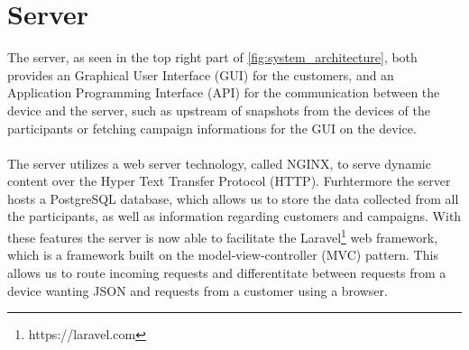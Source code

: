 \section{Server}
\label{sec:server}
The server, as seen in the top right part of \ref{fig:system_architecture}, both provides an Graphical User Interface (GUI) for the customers, and an Application Programming Interface (API) for the communication between the device and the server, such as upstream of snapshots from the devices of the participants or fetching campaign informations for the GUI on the device. 
\\\\
The server utilizes a web server technology, called NGINX, to serve dynamic content over the Hyper Text Transfer Protocol (HTTP). Furhtermore the server hosts a PostgreSQL database, which allows us to store the data collected from all the participants, as well as information regarding customers and campaigns.  
With these features the server is now able to facilitate the Laravel\footnote{https://laravel.com} web framework, which is a framework built on the model-view-controller (MVC) pattern. This allows us to route incoming requests and differentitate between requests from a device wanting JSON and requests from a customer using a browser. 






